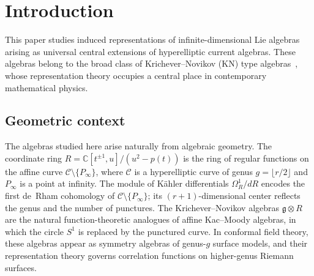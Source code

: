 \documentclass{amsart}
\newcommand{\Cx}{\mathbb{C}}
\newcommand{\g}{\mathfrak{g}}
\theoremstyle{definition}
\theoremstyle{remark}
\numberwithin{equation}{section}
\begin{document}
\section{Introduction}\label{sec:intro}
This paper studies induced representations of infinite-dimensional Lie
algebras arising as universal central extensions of hyperelliptic current
algebras.  These algebras belong to the broad class of
Krichever--Novikov (KN) type algebras~\cite{krichever1987algebras},
whose representation theory occupies a central place in contemporary
mathematical physics.
\subsection*{Geometric context}
The algebras studied here arise naturally from algebraic geometry.  The
coordinate ring $R=\Cx[t^{\pm1},u]/(u^2-p(t))$ is the ring of regular
functions on the affine curve $\mathcal{C}\setminus\{P_\infty\}$, where
$\mathcal{C}$ is a hyperelliptic curve of genus $g=\lfloor r/2\rfloor$
and $P_\infty$ is a point at infinity.  The module of K\"ahler
differentials $\Omega_R^1/dR$ encodes the first de~Rham cohomology of
$\mathcal{C}\setminus\{P_\infty\}$; its $(r+1)$-dimensional center
reflects the genus and the number of punctures.  The Krichever--Novikov
algebras $\g\otimes R$ are the natural function-theoretic analogues of
affine Kac--Moody algebras, in which the circle $S^1$ is replaced by
the punctured curve.  In conformal field theory, these algebras appear
as symmetry algebras of genus-$g$ surface models, and their
representation theory governs correlation functions on higher-genus
Riemann surfaces.
\end{document}
